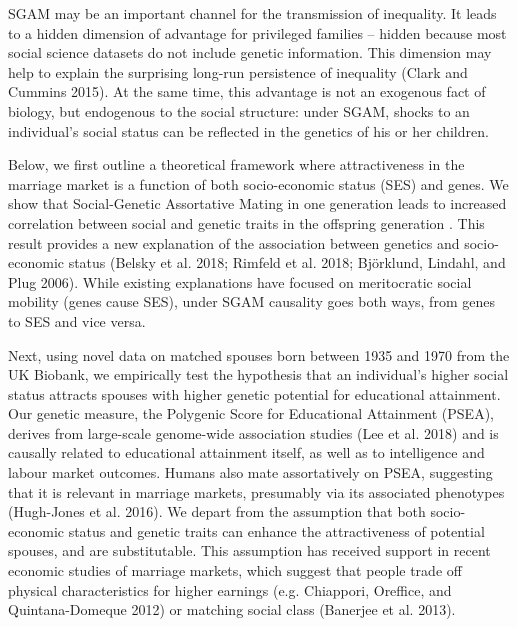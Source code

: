 \documentclass[
]{article}
\begin{document}
SGAM may be an important channel for the transmission of inequality. It leads
to a hidden dimension of advantage for privileged families -- hidden because most
social science datasets do not include genetic information. This dimension may
help to explain the surprising long-run persistence of inequality
(Clark and Cummins 2015). At the same time, this advantage is not an
exogenous fact of biology, but endogenous to the social structure: under SGAM,
shocks to an individual's social status can be reflected in the genetics of his
or her children.

Below, we first outline a theoretical framework where attractiveness in the
marriage market is a function of both socio-economic status (SES) and genes. We
show that Social-Genetic Assortative Mating in one generation leads to increased
correlation between social and genetic traits in the offspring generation .
This result provides a new explanation of the association between genetics and
socio-economic status (Belsky et al. 2018; Rimfeld et al. 2018; Björklund, Lindahl, and Plug 2006). While existing explanations have focused on meritocratic
social mobility (genes cause SES), under SGAM causality goes both ways, from
genes to SES and vice versa.

Next, using novel data on matched spouses born between 1935 and 1970 from the UK
Biobank, we empirically test the hypothesis that an individual's higher social
status attracts spouses with higher genetic potential for educational attainment.
Our genetic measure, the Polygenic Score for Educational Attainment (PSEA),
derives from large-scale genome-wide association studies (Lee et al. 2018) and
is causally related to educational attainment itself, as well as to intelligence
and labour market outcomes. Humans also mate assortatively on PSEA, suggesting
that it is relevant in marriage markets, presumably via its associated
phenotypes (Hugh-Jones et al. 2016). We depart from the assumption that both
socio-economic status and genetic traits can enhance the attractiveness of
potential spouses, and are substitutable. This assumption has received support
in recent economic studies of marriage markets, which suggest that people trade
off physical characteristics for higher earnings (e.g. Chiappori, Oreffice, and Quintana-Domeque 2012) or matching social class (Banerjee et al. 2013).
\end{document}
